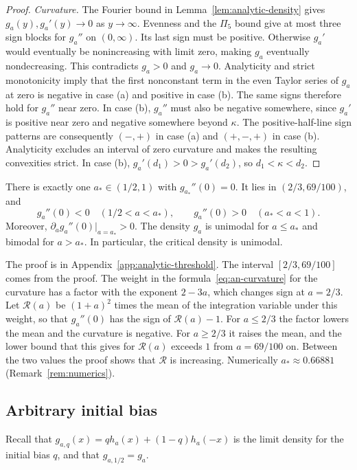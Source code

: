 \begin{proof}
\emph{Curvature.} The Fourier bound in
Lemma~\ref{lem:analytic-density} gives $g_a(y),g_a'(y)\to0$ as
$y\to\infty$. Evenness and the $\Pi_5$ bound give at most three sign
blocks for $g_a''$ on $(0,\infty)$. Its last sign must be positive. Otherwise $g_a'$ would eventually
be nonincreasing with limit zero, making $g_a$ eventually nondecreasing.
This contradicts $g_a>0$ and $g_a\to0$.
Analyticity and strict monotonicity imply that the first nonconstant
term in the even Taylor series of $g_a$ at zero is negative in case (a)
and positive in case (b). The same signs therefore hold for $g_a''$
near zero. In case (b), $g_a''$ must also be negative somewhere, since
$g_a'$ is positive near zero and negative somewhere beyond $\kappa$.
The positive-half-line sign patterns are consequently $(-,+)$ in
case (a) and $(+,-,+)$ in case (b). Analyticity excludes an interval
of zero curvature and makes the resulting convexities strict. In
case (b), $g_a'(d_1)>0>g_a'(d_2)$, so $d_1<\kappa<d_2$.
\end{proof}

\begin{theorem}\label{thm:threshold}
There is exactly one $a_*\in(1/2,1)$ with $g_{a_*}''(0)=0$.
It lies in $(2/3,69/100)$, and
\[
 g_a''(0)<0\quad(1/2<a<a_*),\qquad
 g_a''(0)>0\quad(a_*<a<1).
\]
Moreover, $\partial_a g_a''(0)|_{a=a_*}>0$.
The density $g_a$ is unimodal for $a\le a_*$ and bimodal for
$a>a_*$. In particular, the critical density is unimodal.
\end{theorem}

The proof is in Appendix~\ref{app:analytic-threshold}. The interval
$[2/3,69/100]$ comes from the proof. The weight in the formula~\eqref{eq:an-curvature} for the
curvature has a factor with the exponent $2-3a$, which changes sign at
$a=2/3$. Let $\mathcal R(a)$ be $(1+a)^2$ times the mean of the
integration variable under this weight, so that $g_a''(0)$ has the
sign of $\mathcal R(a)-1$. For $a\le2/3$ the factor lowers the mean
and the curvature is negative. For $a\ge2/3$ it raises the mean, and
the lower bound that this gives for $\mathcal R(a)$ exceeds $1$ from
$a=69/100$ on. Between the two values the proof shows that $\mathcal R$ is
increasing. Numerically $a_*\approx0.66881$
(Remark~\ref{rem:numerics}).

\subsection{Arbitrary initial bias}

Recall that $g_{a,q}(x)=q h_a(x)+(1-q)h_a(-x)$ is the limit density
for the initial bias $q$, and that $g_{a,1/2}=g_a$.


